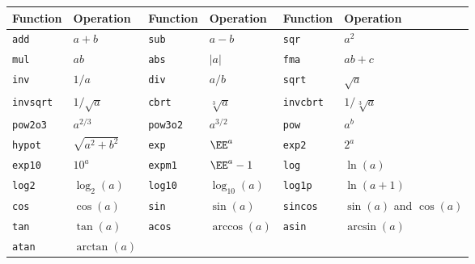 \begin{table}[ht]
  \begin{tabu}{X[l]X[2l]X[l]X[2l]X[l]X[2l]}
    \toprule
    Function & Operation &
    Function & Operation &
    Function & Operation \\
    \midrule
    \texttt{add}     & $a + b$                               &
    \texttt{sub}     & $a - b$                               &
    \texttt{sqr}     & $a^2$                                 \\
    \texttt{mul}     & $ab$                                  &
    \texttt{abs}     & $|a|$                                 &
    \texttt{fma}     & $ab + c$                              \\
    \texttt{inv}     & $1 / a$                               &
    \texttt{div}     & $a / b$                               &
    \texttt{sqrt}    & $\sqrt{a}$                            \\
    \texttt{invsqrt} & $1 / \sqrt{a}$                        &
    \texttt{cbrt}    & $\sqrt[3]{a}$                         &
    \texttt{invcbrt} & $1 / \sqrt[3]{a}$                     \\
    \texttt{pow2o3}  & $a^{2/3}$                             &
    \texttt{pow3o2}  & $a^{3/2}$                             &
    \texttt{pow}     & $a^b$                                 \\
    \texttt{hypot}   & $\sqrt{a^2 + b^2}$                    &
    \texttt{exp}     & $\EE^a$                               &
    \texttt{exp2}    & $2^a$                                 \\
    \texttt{exp10}   & $10^a$                                &
    \texttt{expm1}   & $\EE^a - 1$                           &
    \texttt{log}     & $\ln(a)$                              \\
    \texttt{log2}    & $\log_2(a)$                           &
    \texttt{log10}   & $\log_{10}(a)$                        &
    \texttt{log1p}   & $\ln(a + 1)$                          \\
    \texttt{cos}     & $\cos(a)$                             &
    \texttt{sin}     & $\sin(a)$                             &
    \texttt{sincos}  & $\sin(a)$ and $\cos(a)$               \\
    \texttt{tan}     & $\tan(a)$                             &
    \texttt{acos}    & $\arccos(a)$                          &
    \texttt{asin}    & $\arcsin(a)$                          \\
    \texttt{atan}    & $\arctan(a)$                          &

\end{tabu}
\end{table}
